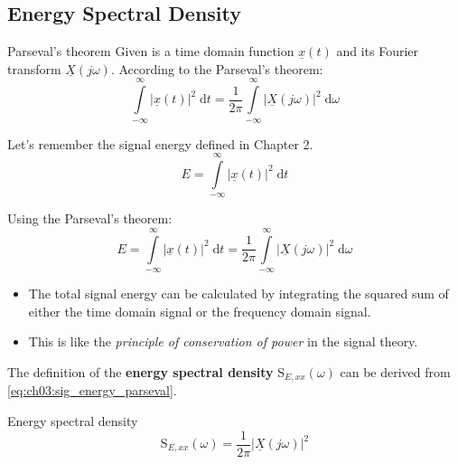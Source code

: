 \begin{refsection}
\subsection{Energy Spectral Density}

\begin{definition}{Parseval's theorem}
	Given is a time domain function $\underline{x}(t)$ and its Fourier transform $\underline{X}\left(j \omega\right)$. According to the  Parseval's theorem:
	\begin{equation}
		\int\limits_{-\infty}^{\infty} \left|\underline{x}(t)\right|^2 \; \mathrm{d} t = \frac{1}{2 \pi} \int\limits_{-\infty}^{\infty} \left|\underline{X}\left(j \omega\right)\right|^2 \; \mathrm{d} \omega
	\end{equation}
\end{definition}

Let's remember the signal energy defined in Chapter 2.
\begin{equation}
	E = \int\limits_{-\infty}^{\infty} \left|\underline{x}(t)\right|^2 \; \mathrm{d} t
\end{equation}

Using the Parseval's theorem:
\begin{equation}
	E = \int\limits_{-\infty}^{\infty} \left|\underline{x}(t)\right|^2 \; \mathrm{d} t = \frac{1}{2 \pi} \int\limits_{-\infty}^{\infty} \left|\underline{X}\left(j \omega\right)\right|^2 \; \mathrm{d} \omega
	\label{eq:ch03:sig_energy_parseval}
\end{equation}

\begin{itemize}
	\item The total signal energy can be calculated by integrating the squared sum of either the time domain signal or the frequency domain signal.
	\item This is like the \emph{principle of conservation of power} in the signal theory.
\end{itemize}

The definition of the \textbf{energy spectral density} $\mathrm{S}_{E,xx}(\omega)$ can be derived from \eqref{eq:ch03:sig_energy_parseval}.

\begin{definition}{Energy spectral density}
	\begin{equation}
		\mathrm{S}_{E,xx}(\omega) = \frac{1}{2 \pi} \left|\underline{X}\left(j \omega\right)\right|^2
	\end{equation}%
	

\end{definition}
\end{refsection}
